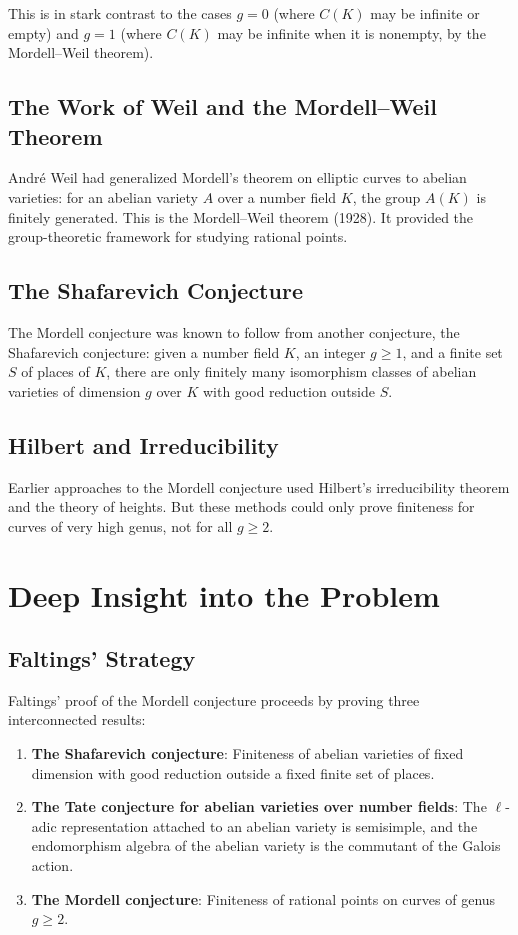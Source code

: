 This is in stark contrast to the cases $g = 0$ (where $C(K)$ may be infinite or empty) and $g = 1$ (where $C(K)$ may be infinite when it is nonempty, by the Mordell--Weil theorem).

\subsection{The Work of Weil and the Mordell--Weil Theorem}

Andr\'e Weil had generalized Mordell's theorem on elliptic curves to abelian varieties: for an abelian variety $A$ over a number field $K$, the group $A(K)$ is finitely generated. This is the Mordell--Weil theorem (1928). It provided the group-theoretic framework for studying rational points.

\subsection{The Shafarevich Conjecture}

The Mordell conjecture was known to follow from another conjecture, the Shafarevich conjecture: given a number field $K$, an integer $g \geq 1$, and a finite set $S$ of places of $K$, there are only finitely many isomorphism classes of abelian varieties of dimension $g$ over $K$ with good reduction outside $S$.

\subsection{Hilbert and Irreducibility}

Earlier approaches to the Mordell conjecture used Hilbert's irreducibility theorem and the theory of heights. But these methods could only prove finiteness for curves of very high genus, not for all $g \geq 2$.

\section{Deep Insight into the Problem}

\subsection{Faltings' Strategy}

Faltings' proof of the Mordell conjecture proceeds by proving three interconnected results:

\begin{enumerate}
\item \textbf{The Shafarevich conjecture}: Finiteness of abelian varieties of fixed dimension with good reduction outside a fixed finite set of places.
\item \textbf{The Tate conjecture for abelian varieties over number fields}: The $\ell$-adic representation attached to an abelian variety is semisimple, and the endomorphism algebra of the abelian variety is the commutant of the Galois action.
\item \textbf{The Mordell conjecture}: Finiteness of rational points on curves of genus $g \geq 2$.
\end{enumerate}

